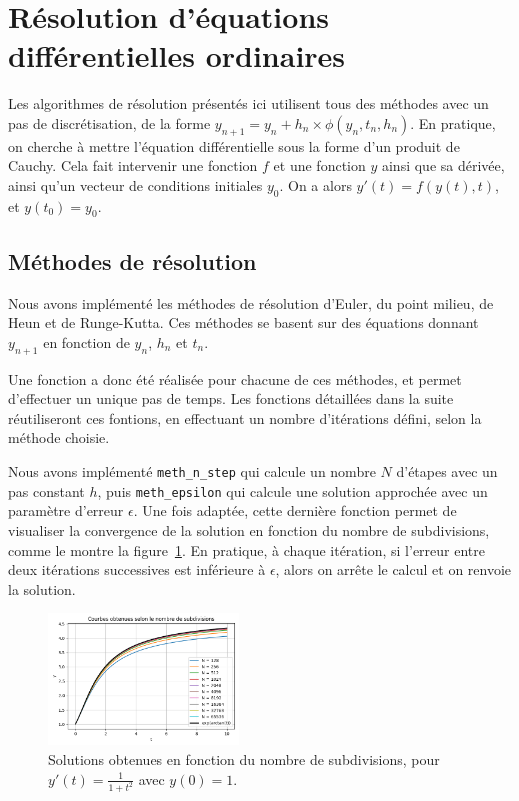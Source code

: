 \section{Résolution d'équations différentielles ordinaires}\label{sec:sec1}
Les algorithmes de résolution présentés ici utilisent tous des méthodes avec un pas de discrétisation, de la forme
$y_{n+1}=y_n+h_n \times \phi (y_n,t_n,h_n)$. En pratique, on cherche à mettre l'équation différentielle sous la forme d'un produit de Cauchy.
Cela fait intervenir une fonction $f$ et une fonction $y$ ainsi que sa dérivée, ainsi qu'un vecteur de conditions initiales $y_0$.
On a alors $y'(t)=f(y(t),t)$, et $y(t_0)=y_0$.

\subsection{Méthodes de résolution}
Nous avons implémenté les méthodes de résolution d’Euler, du point milieu, de Heun et de Runge-Kutta.
Ces méthodes se basent sur des équations donnant $y_{n+1}$ en fonction de $y_n$, $h_n$ et $t_n$.

Une fonction a donc été réalisée pour chacune de ces méthodes, et permet d'effectuer un unique pas de temps.
Les fonctions détaillées dans la suite réutiliseront ces fontions, en effectuant un nombre d'itérations défini, selon la méthode choisie.

Nous avons implémenté \texttt{meth\_n\_step} qui calcule un nombre $N$ d'étapes avec un pas constant $h$,
puis \texttt{meth\_epsilon} qui calcule une solution approchée avec un paramètre d’erreur $\epsilon$.
Une fois adaptée, cette dernière fonction permet de visualiser la convergence de la solution en fonction du nombre de subdivisions,
comme le montre la figure~\ref{fig:subdivision}.
En pratique, à chaque itération, si l'erreur entre deux itérations successives est inférieure à $\epsilon$,
alors on arrête le calcul et on renvoie la solution.

\begin{figure}[htbp!]
	\centering
	\includegraphics[width=0.45\textwidth]{res/subdivisions}
	\caption{Solutions obtenues en fonction du nombre de subdivisions, pour $y'(t) = \frac{1}{1 + t^2}$ avec $y(0) = 1$.}
	\label{fig:subdivision}
\end{figure}

